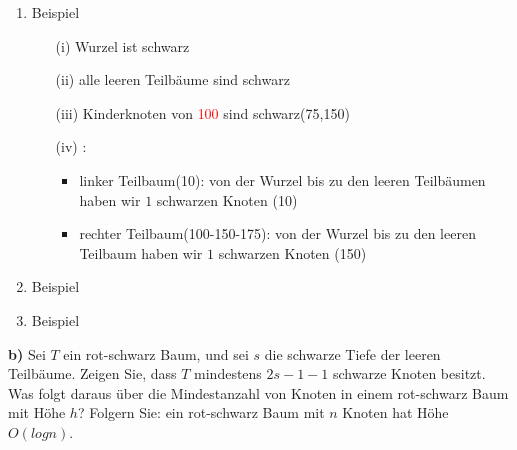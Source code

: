 \begin{multicols}{2}

\begin{enumerate}

\item Beispiel




\begin{itemize}
	\item[(i)] Wurzel ist schwarz
	\item[(ii)] alle leeren Teilbäume sind schwarz
	\item[(iii)] Kinderknoten von \textcolor{red}{100} sind schwarz(75,150)
	\item[(iv)]:
	\begin{itemize}
		\item linker Teilbaum(10): von der Wurzel bis zu den leeren Teilbäumen haben wir $1$ schwarzen Knoten (10)
		\item rechter Teilbaum(100-150-175): von der Wurzel bis zu den leeren Teilbaum haben wir $1$ schwarzen Knoten (150)
	\end{itemize}
\end{itemize}

\item Beispiel

\item Beispiel

\end{enumerate}

\end{multicols}

\newpage
\noindent
\textbf{b)} Sei $T$ ein rot-schwarz Baum, und sei $s$ die schwarze Tiefe der leeren Teilbäume. Zeigen Sie, dass $T$ mindestens $2s-1 - 1$ schwarze Knoten besitzt. Was folgt daraus über die Mindestanzahl von Knoten in einem rot-schwarz Baum mit Höhe $h$? Folgern Sie: ein rot-schwarz Baum mit $n$ Knoten hat Höhe $O(log n)$.\\



